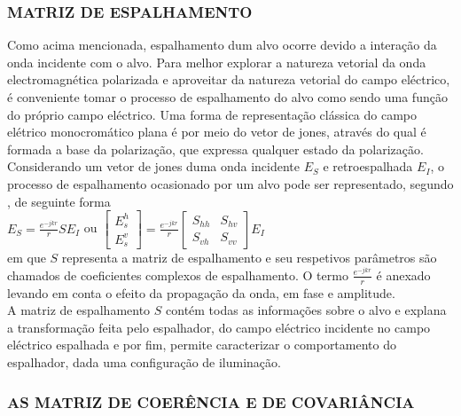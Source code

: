 \documentclass[a4paper,12pt]{article}
\begin{document}
\subsubsection{MATRIZ DE ESPALHAMENTO}
Como acima mencionada, espalhamento dum alvo ocorre devido a interação da onda incidente com o alvo. Para melhor explorar a natureza vetorial da onda electromagnética polarizada e aproveitar da natureza vetorial do campo eléctrico, é conveniente tomar o processo de espalhamento do alvo como sendo uma função do próprio campo eléctrico. Uma forma de representação clássica do campo elétrico monocromático plana é por meio do vetor de jones, através do qual é formada a base da polarização, que expressa qualquer estado da polarização. Considerando um vetor de jones duma onda incidente $E_{S}$ e  retroespalhada $E_{I}$, o processo de espalhamento ocasionado por um alvo pode ser representado, segundo \cite{jong:2009}, de seguinte forma \\ 

$E_{S} = \frac{e^{-jkr}}{r} S  E_{I}$ ou 
$\left[\begin{array}{c}
     E^h_{s} \\
     E^v_{s} 
 \end{array}\right] = \frac{e^{-jkr}}{r}   
 \left[\begin{array}{cc}
     S_{hh} & S_{hv} \\
     S_{vh} & S_{vv}
 \end{array}\right]E_{I}$ \\
 
em que $S$ representa a matriz de espalhamento e seu respetivos parâmetros são chamados de coeficientes complexos de espalhamento. O termo  $\frac{e^{-jkr}}{r}$ é anexado levando em conta o efeito da propagação da onda, em fase e amplitude.\\

A matriz de espalhamento $S$ contém todas as informações sobre o alvo e explana a transformação feita pelo espalhador, do campo eléctrico incidente no campo eléctrico espalhada e por fim, permite caracterizar o comportamento do espalhador, dada uma configuração de iluminação.\\

\subsubsection{AS MATRIZ DE COERÊNCIA E DE COVARIÂNCIA}
\label{subsec:Mc}
\end{document}
